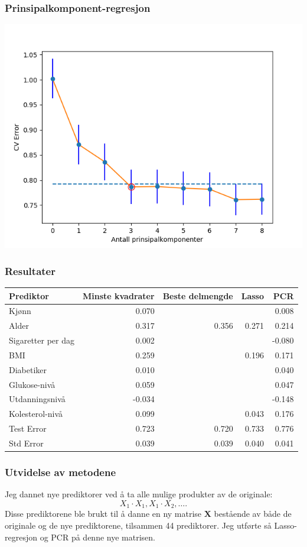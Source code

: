 \documentclass[aspectratio=169]{beamer}
\begin{document}
\begin{frame}
  \frametitle{Prinsipalkomponent-regresjon}
  \begin{center}
    \includegraphics[height=0.8\textheight]{pcr_CV.png}
  \end{center}
\end{frame}

\begin{frame}
  \frametitle{Resultater}
  \begin{tabular}{ l r r r r}
    Prediktor & Minste kvadrater & Beste delmengde & Lasso & PCR \\
    \hline
    Kjønn & 0.070 & & & 0.008 \\
    Alder & 0.317 & 0.356 & 0.271 & 0.214 \\
    Sigaretter per dag & 0.002 & & & -0.080 \\
    BMI & 0.259 & & 0.196 & 0.171 \\
    Diabetiker & 0.010 & & & 0.040 \\
    Glukose-nivå & 0.059 & & & 0.047 \\
    Utdanningsnivå & -0.034 & & & -0.148 \\
    Kolesterol-nivå & 0.099 & & 0.043 & 0.176 \\
    \hline
    Test Error & 0.723 & 0.720 & 0.733 & 0.776 \\
    Std Error & 0.039 & 0.039 & 0.040 & 0.041 \\
  \end{tabular}
\end{frame}

\begin{frame}
  \frametitle{Utvidelse av metodene}

  Jeg dannet nye prediktorer ved å ta alle mulige produkter av de originale: \[X_1 \cdot X_1, X_1 \cdot X_2, \dots.\]
  \pause
  Disse prediktorene ble brukt til å danne en ny matrise \(\textbf{X}\) bestående av både de originale og de nye prediktorene, tilsammen 44 prediktorer.
  \pause
  Jeg utførte så Lasso-regresjon og PCR på denne nye matrisen.
\end{frame}
\end{document}
